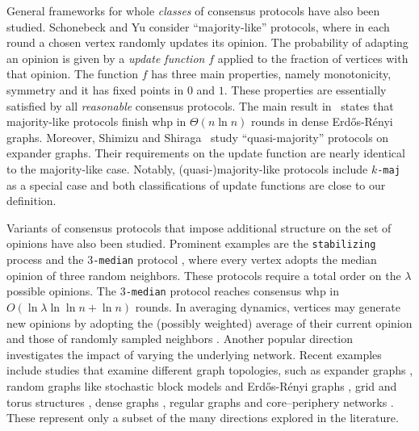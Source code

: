 \documentclass[11pt]{article}
\numberwithin{theorem}{section}
\begin{document}
General frameworks for whole \emph{classes} of consensus protocols have also been studied. 
Schonebeck and Yu \cite{consesusIPS} consider ``majority-like'' protocols, where in each round a chosen vertex randomly updates its opinion. The probability of adapting an opinion is given by a \textit{update function} $f$ applied to the fraction of vertices with that opinion. The function $f$ has three main properties, namely monotonicity, symmetry and it has fixed points in $0$ and $1$. These properties are essentially satisfied by all \emph{reasonable} consensus protocols. The main result in~\cite{consesusIPS} states that majority-like protocols finish whp in $\Theta (n\ln n)$ rounds in dense Erd\H{o}s-R\'enyi graphs.
Moreover, Shimizu and Shiraga~\cite{expander} study ``quasi-majority'' protocols on expander graphs. Their requirements on the update function are nearly identical to the majority-like case.
Notably, (quasi-)majority-like protocols include \texttt{$k$-maj} as a special case and both classifications of update functions are close to our definition.

Variants of consensus protocols that impose additional structure on the set of opinions have also been studied. Prominent examples are the \texttt{stabilizing} process \cite{angluinetal} and the \texttt{$3$-median} protocol \cite{twochoicestabconsensus}, where every vertex adopts the median opinion of three random neighbors. These protocols require a total order on the $\lambda$ possible opinions. The \texttt{$3$-median} protocol reaches consensus whp in $O(\ln \lambda \ln\ln n + \ln n)$ rounds. In averaging dynamics, vertices may generate new opinions by adopting the (possibly weighted) average of their current opinion and those of randomly sampled neighbors \cite{boydetal,shahbook}.  Another popular direction investigates the impact of varying the underlying network. Recent examples include studies that examine different graph topologies, such as expander graphs \cite{expander, expanderserdosrenyi}, random graphs like stochastic block models and Erd\H{o}s-R\'enyi graphs \cite{binomialrandomgraph,consesusIPS,stochasticblockmodel,expanderserdosrenyi}, grid and torus structures \cite{gridmaj,torus}, dense graphs \cite{densegraphs}, regular graphs \cite{regulargraphtwochoice} and core–periphery networks \cite{crucianietal}. These represent only a subset of the many directions explored in the literature. 
\end{document}
